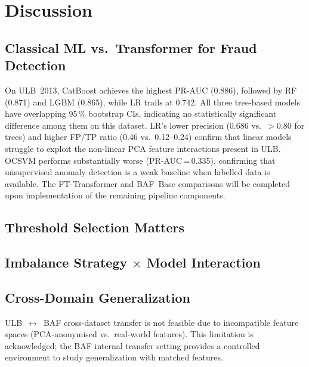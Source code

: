 \section{Discussion}
\label{sec:discussion}

\subsection{Classical ML vs.\ Transformer for Fraud Detection}

On ULB~2013, CatBoost achieves the highest PR-AUC (0.886),
followed by RF (0.871) and LGBM (0.865), while LR trails at 0.742.
All three tree-based models have overlapping 95\,\% bootstrap CIs,
indicating no statistically significant difference among them on this dataset.
LR's lower precision (0.686 vs.\ $>$0.80 for trees) and higher FP/TP ratio
(0.46 vs.\ 0.12--0.24) confirm that linear models struggle to exploit
the non-linear PCA feature interactions present in ULB.
OCSVM performs substantially worse (PR-AUC\,=\,0.335),
confirming that unsupervised anomaly detection is a weak baseline
when labelled data is available.
The FT-Transformer and BAF~Base comparisons will be completed upon
implementation of the remaining pipeline components.

\subsection{Threshold Selection Matters}


\subsection{Imbalance Strategy $\times$ Model Interaction}


\subsection{Cross-Domain Generalization}


ULB~$\leftrightarrow$~BAF cross-dataset transfer is not feasible due
to incompatible feature spaces (PCA-anonymised vs.\ real-world features).
This limitation is acknowledged; the BAF internal transfer setting
provides a controlled environment to study generalization with matched features.


